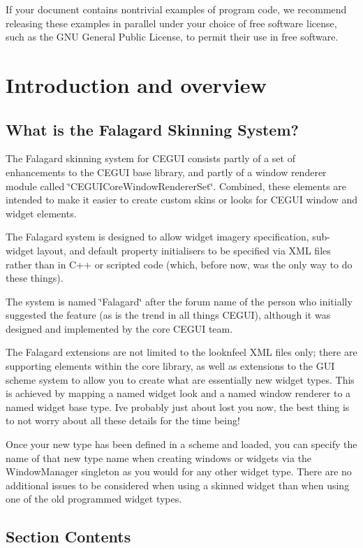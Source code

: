 If your document contains nontrivial examples of program code, we recommend releasing these examples in parallel under your choice of free software license, such as the G\+NU General Public License, to permit their use in free software. \hypertarget{fal_intro}{}\section{Introduction and overview}\label{fal_intro}
\hypertarget{fal_intro_fal_whatis}{}\subsection{What is the Falagard Skinning System?}\label{fal_intro_fal_whatis}
The Falagard skinning system for C\+E\+G\+UI consists partly of a set of enhancements to the C\+E\+G\+UI base library, and partly of a window renderer module called \char`\"{}\+C\+E\+G\+U\+I\+Core\+Window\+Renderer\+Set\char`\"{}. Combined, these elements are intended to make it easier to create custom skins or \textquotesingle{}looks\textquotesingle{} for C\+E\+G\+UI window and widget elements.

The Falagard system is designed to allow widget imagery specification, sub-\/widget layout, and default property initialisers to be specified via X\+ML files rather than in C++ or scripted code (which, before now, was the only way to do these things).

The system is named \char`\"{}\+Falagard\char`\"{} after the forum name of the person who initially suggested the feature (as is the trend in all things C\+E\+G\+UI), although it was designed and implemented by the core C\+E\+G\+UI team.

The Falagard extensions are not limited to the \textquotesingle{}looknfeel\textquotesingle{} X\+ML files only; there are supporting elements within the core library, as well as extensions to the G\+UI scheme system to allow you to create what are essentially new widget types. This is achieved by mapping a named widget \textquotesingle{}look\textquotesingle{} and a named window renderer to a named widget base type. I\textquotesingle{}ve probably just about lost you now, the best thing is to not worry about all these details for the time being!

Once your new type has been defined in a scheme and loaded, you can specify the name of that new type name when creating windows or widgets via the Window\+Manager singleton as you would for any other widget type. There are no additional issues to be considered when using a \textquotesingle{}skinned\textquotesingle{} widget than when using one of the old \textquotesingle{}programmed\textquotesingle{} widget types.\hypertarget{fal_intro_fal_intro_contents}{}\subsection{Section Contents}\label{fal_intro_fal_intro_contents}


